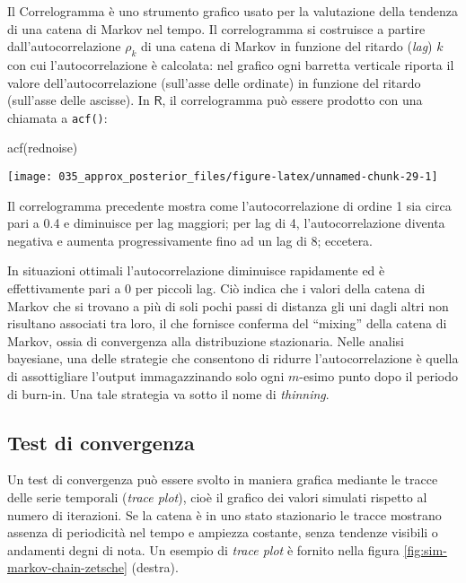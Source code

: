 \documentclass[
]{memoir}
\newenvironment{Shaded}{\begin{snugshade}}{\end{snugshade}}
\newcommand{\FunctionTok}[1]{\textcolor[rgb]{0.00,0.00,0.00}{#1}}
\newcommand{\NormalTok}[1]{#1}
\newcommand{\R}{\textsf{R}} %
\begin{document}
Il Correlogramma è uno strumento grafico usato per la valutazione della tendenza di una catena di Markov nel tempo. Il correlogramma si costruisce a partire dall'autocorrelazione \(\rho_k\) di una catena di Markov in funzione del ritardo (\emph{lag}) \(k\) con cui l'autocorrelazione è calcolata: nel grafico ogni barretta verticale riporta il valore dell'autocorrelazione (sull'asse delle ordinate) in funzione del ritardo (sull'asse delle ascisse). In \(\R\), il correlogramma può essere prodotto con una chiamata a \texttt{acf()}:

\begin{Shaded}
\begin{Highlighting}[]
\FunctionTok{acf}\NormalTok{(rednoise)}
\end{Highlighting}
\end{Shaded}

\begin{center}\texttt{[image: 035\_approx\_posterior\_files/figure-latex/unnamed-chunk-29-1]} \end{center}

Il correlogramma precedente mostra come l'autocorrelazione di ordine 1 sia circa pari a 0.4 e diminuisce per lag maggiori; per lag di 4, l'autocorrelazione diventa negativa e aumenta progressivamente fino ad un lag di 8; eccetera.

In situazioni ottimali l'autocorrelazione diminuisce rapidamente ed è effettivamente pari a 0 per piccoli lag. Ciò indica che i valori della catena di Markov che si trovano a più di soli pochi passi di distanza gli uni dagli altri non risultano associati tra loro, il che fornisce conferma del ``mixing'' della catena di Markov, ossia di convergenza alla distribuzione stazionaria.
Nelle analisi bayesiane, una delle strategie che consentono di ridurre l'autocorrelazione è quella di assottigliare l'output immagazzinando solo ogni \(m\)-esimo punto dopo il periodo di burn-in. Una tale strategia va sotto il nome di \emph{thinning}.

\hypertarget{test-di-convergenza}{%
\subsection{Test di convergenza}\label{test-di-convergenza}}

Un test di convergenza può essere svolto in maniera grafica mediante le tracce delle serie temporali (\emph{trace plot}), cioè il grafico dei valori simulati rispetto al numero di iterazioni. Se la catena è in uno stato stazionario le tracce mostrano assenza di periodicità nel tempo e ampiezza costante, senza tendenze visibili o andamenti degni di nota. Un esempio di \emph{trace plot} è fornito nella figura \ref{fig:sim-markov-chain-zetsche} (destra).
\end{document}
